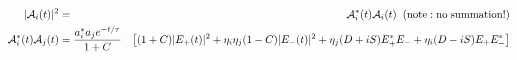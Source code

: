\documentclass[a4paper,9pt,twoside]{article}
\begin{document}

\begin{eqnarray}
   |{\cal A}_i(t)|^2  &=& {\cal A}_i^*(t){\cal A}_i(t) \;\; (\mathrm{note: no\; summation!}) \\
  {\cal A}_i^*(t) {\cal A}_j(t) &= \frac{ a_i^* a_j e^{-t/\tau}} {1+C}&\left[ (1+C) |E_+(t)|^2  +\eta_i\eta_j (1-C)|E_-(t)|^2 + \eta_j(D+iS)E_+^*E_-+\eta_i(D-iS)E_+E_-^*   \right] \\

\end{eqnarray}
\end{document}
